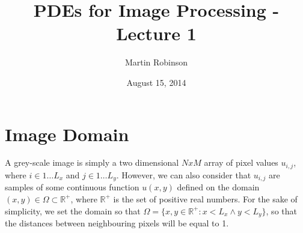 \documentclass[11pt,a4paper,noindent]{article}
\begin{document}

\title{PDEs for Image Processing - Lecture 1}
\date{August 15, 2014}
\author{Martin Robinson}

\maketitle

%

\section{Image Domain}
A grey-scale image is simply a two dimensional $NxM$ array of pixel values $u_{i,j}$, where $i \in {1\ldots L_x}$ and $j \in {1\ldots L_y}$. However, we can also consider that $u_{i,j}$ are samples of some continuous function $u(x,y)$ defined on the domain $(x,y) \in \Omega \subset \mathbb{R}^+$, where $\mathbb{R}^+$ is the set of positive real numbers. For the sake of simplicity, we set the domain so that $\Omega = \{x,y \in \mathbb{R}^+: x < L_x \wedge y < L_y\}$, so that the distances between neighbouring pixels will be equal to 1.
\end{document}
